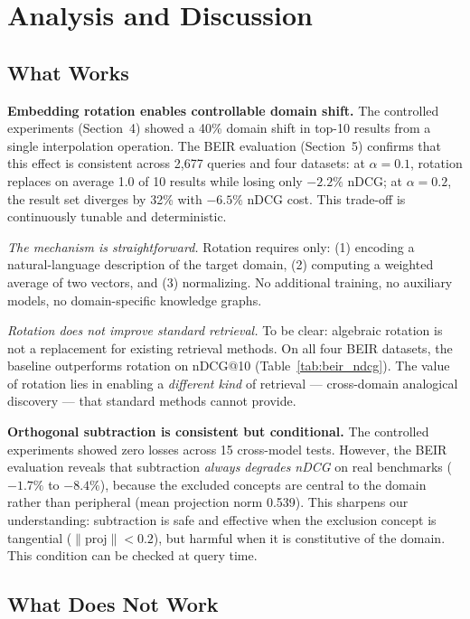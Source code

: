 \documentclass{article}
\begin{document}
\section{Analysis and Discussion}

\subsection{What Works}

\textbf{Embedding rotation enables controllable domain shift.} The controlled experiments (Section~4) showed a 40\% domain shift in top-10 results from a single interpolation operation. The BEIR evaluation (Section~5) confirms that this effect is consistent across 2,677 queries and four datasets: at $\alpha = 0.1$, rotation replaces on average 1.0 of 10 results while losing only $-2.2\%$ nDCG; at $\alpha = 0.2$, the result set diverges by 32\% with $-6.5\%$ nDCG cost. This trade-off is continuously tunable and deterministic.

\emph{The mechanism is straightforward.} Rotation requires only: (1) encoding a natural-language description of the target domain, (2) computing a weighted average of two vectors, and (3) normalizing. No additional training, no auxiliary models, no domain-specific knowledge graphs.

\emph{Rotation does not improve standard retrieval.} To be clear: algebraic rotation is not a replacement for existing retrieval methods. On all four BEIR datasets, the baseline outperforms rotation on nDCG@10 (Table~\ref{tab:beir_ndcg}). The value of rotation lies in enabling a \emph{different kind} of retrieval --- cross-domain analogical discovery --- that standard methods cannot provide.

\textbf{Orthogonal subtraction is consistent but conditional.} The controlled experiments showed zero losses across 15 cross-model tests. However, the BEIR evaluation reveals that subtraction \emph{always degrades nDCG} on real benchmarks ($-1.7\%$ to $-8.4\%$), because the excluded concepts are central to the domain rather than peripheral (mean projection norm 0.539). This sharpens our understanding: subtraction is safe and effective when the exclusion concept is tangential ($\|\text{proj}\| < 0.2$), but harmful when it is constitutive of the domain. This condition can be checked at query time.

\subsection{What Does Not Work}
\end{document}
